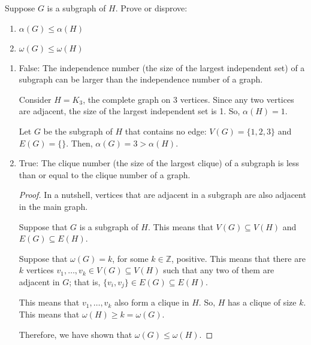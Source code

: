 \documentclass{article}
\newcommand{\Z}{\mathbb{Z}}
\theoremstyle{definition}
\begin{document}
\begin{question}
    Suppose $G$ is a subgraph of $H$.  Prove or disprove:
\begin{enumerate}
	\item $\alpha(G) \leq \alpha(H)$
	\item $\omega(G) \leq \omega(H)$
	\end{enumerate}
\end{question}
\begin{solution}
\begin{enumerate}
	\item False: The independence number (the size of the largest independent set) of a subgraph can be larger than the independence number of a graph.

Consider $H = K_3$, the complete graph on 3 vertices.  Since any two vertices are adjacent, the size of the largest independent set is 1.  So, $\alpha(H)= 1$.

Let $G$ be the subgraph of $H$ that contains no edge: $V(G) = \{1, 2, 3\}$ and $E(G) = \{ \}$.  Then, $\alpha(G) = 3 > \alpha(H)$.

	\item True: The clique number (the size of the largest clique) of a subgraph is less than or equal to the clique number of a graph.

\begin{proof}
In a nutshell, vertices that are adjacent in a subgraph are also adjacent in the main graph.

Suppose that $G$ is a subgraph of $H$.  This means that $V(G) \subseteq V(H)$ and $E(G) \subseteq E(H)$.

Suppose that $\omega(G) = k$, for some $k \in \Z$, positive.  This means that there are $k$ vertices $v_1, \ldots, v_k \in V(G) \subseteq V(H)$ such that any two of them are adjacent in $G$; that is, $\{v_i, v_j \} \in E(G) \subseteq E(H)$.

This means that $v_1, \ldots, v_k$ also form a clique in $H$.  So, $H$ has a clique of size $k$.  This means that $\omega(H) \geq k = \omega(G)$.

Therefore, we have shown that $\omega(G) \leq \omega(H)$.
\end{proof}
\end{enumerate}
\end{solution}
\end{document}
